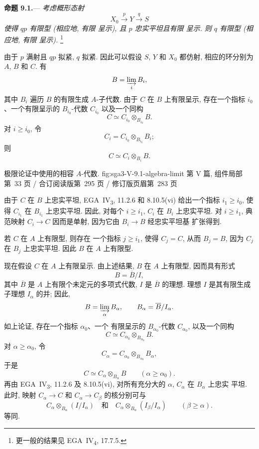 \medskip
{}
\label{prop:sga3-V-9.1}%
\noindent\textbf{命题 9.1.}---%
\textit{考虑概形态射}
\[
  X_0\xrightarrow{\,p\,}Y\xrightarrow{\,q\,}S
\]
\textit{使得 \(qp\) 有限型 (相应地, 有限
呈示), 且 \(p\) 忠实平坦且有限
呈示. 则 \(q\) 有限型 (相应地, 有限
呈示).}%
\begingroup
\renewcommand{\thefootnote}{*}%
\footnote{\label{note:sga3-V-9.1-generalization}更一般的结果见
EGA~IV\textsubscript{4}, 17.7.5.}
\endgroup
\addtocounter{footnote}{-1}%

\noindent 由于 \(p\) 满射且 \(qp\) 拟紧,
\(q\) 拟紧. 因此可以假设 \(S\), \(Y\)
和 \(X_0\) 都仿射, 相应的环分别为 \(A\), \(B\) 和 \(C\).
有
\[
  B=\varinjlim_i B_i,
\]
其中 \(B_i\) 遍历 \(B\) 的有限生成
\(A\)-子代数. 由于 \(C\) 在 \(B\) 上有限呈示,
存在一个指标 \(i_0\)、一个有限呈示的 \(B_{i_0}\)-代数
\(C_{i_0}\) 以及一个同构
\[
  C\simeq C_{i_0}\otimes_{B_{i_0}}B.
\]
对 \(i\geq i_0\), 令
\[
  C_i=C_{i_0}\otimes_{B_{i_0}}B_i;
\]
则
\[
  C\simeq C_i\otimes_{B_i}B.
\]

  {极限论证中使用的相容 \(A\)-代数.}
  {fig:sga3-V-9.1-algebra-limit}
  {第 V 篇, 组件局部第~33 页 / 合订阅读版第~295 页 / 修订版页眉第~283 页}

由于 \(C\) 在 \(B\) 上忠实平坦, EGA~IV\textsubscript{3},
11.2.6 和 8.10.5(vi) 给出一个指标 \(i_1\geq i_0\), 使得
\(C_{i_1}\) 在 \(B_{i_1}\) 上忠实平坦. 因此,
对每个 \(i\geq i_1\), \(C_i\) 在 \(B_i\) 上忠实平坦.
对 \(i\geq i_1\), 典范映射 \(C_i\to C\) 因而是单射,
因为它由 \(B_i\to B\) 经忠实平坦基
扩张得到.


若 \(C\) 在 \(A\) 上有限型, 则存在
一个指标 \(j\geq i_1\), 使得 \(C_j=C\), 从而 \(B_j=B\), 因为
\(C_j\) 在 \(B_j\) 上忠实平坦. 因此 \(B\) 在 \(A\) 上有限型.

现在假设 \(C\) 在 \(A\) 上有限呈示. 由上述结果,
\(B\) 在 \(A\) 上有限型, 因而具有形式
\[
  B=\overline B/I,
\]
其中 \(\overline B\) 是 \(A\) 上有限个未定元的多项式代数,
\(I\) 是 \(\overline B\) 的理想.
理想 \(I\) 是其有限生成子理想
\(I_\alpha\) 的并; 因此,
\[
  B=\varinjlim_\alpha B_\alpha,
  \qquad B_\alpha=\overline B/I_\alpha.
\]
如上论证, 存在一个指标 \(\alpha_0\)、一个
有限呈示的 \(B_{\alpha_0}\)-代数 \(C_{\alpha_0}\),
以及一个同构
\[
  C\simeq C_{\alpha_0}\otimes_{B_{\alpha_0}}B.
\]
对 \(\alpha\geq\alpha_0\), 令
\[
  C_\alpha=C_{\alpha_0}\otimes_{B_{\alpha_0}}B_\alpha,
\]
于是
\[
  C\simeq C_\alpha\otimes_{B_\alpha}B
  \qquad(\alpha\geq\alpha_0).
\]
再由 EGA~IV\textsubscript{3}, 11.2.6 及 8.10.5(vi),
对所有充分大的 \(\alpha\), \(C_\alpha\) 在 \(B_\alpha\) 上忠实
平坦. 此时, 映射
\(C_\alpha\to C\) 和 \(C_\alpha\to C_\beta\) 的核分别可与
\[
  C_\alpha\otimes_{B_\alpha}(I/I_\alpha)
  \quad\text{和}\quad
  C_\alpha\otimes_{B_\alpha}(I_\beta/I_\alpha)
  \qquad(\beta\geq\alpha).
\]
等同.

